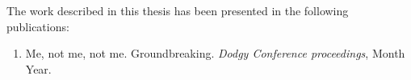 \begin{publications}
The work described in this thesis has been presented in the following publications:

\begin{enumerate}

\item Me, not me, not me. Groundbreaking. \emph{Dodgy Conference proceedings}, Month Year.

\end{enumerate}




\end{publications}
